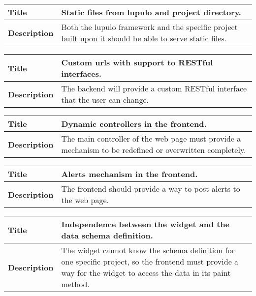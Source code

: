 \documentclass[12pt]{article}
\begin{document}
                \begin{tabularx}{\textwidth}{|l|X|}
                    \hline
                    \textbf{Title} & Static files from lupulo and project
                    directory. \\
                    \hline
                    \textbf{Description} & Both the lupulo framework and the
                    specific project built upon it should be able to serve
                    static files. \\
                    \hline
                \end{tabularx}

                \begin{tabularx}{\textwidth}{|l|X|}
                    \hline
                    \textbf{Title} & Custom urls with support to RESTful
                    interfaces. \\
                    \hline
                    \textbf{Description} & The backend will provide a custom
                    RESTful interface that the user can change. \\
                    \hline
                \end{tabularx}

                \begin{tabularx}{\textwidth}{|l|X|}
                    \hline
                    \textbf{Title} & Dynamic controllers in the frontend. \\
                    \hline
                    \textbf{Description} & The main controller of the web page
                    must provide a mechanism to be redefined or overwritten
                    completely. \\
                    \hline
                \end{tabularx}

                \begin{tabularx}{\textwidth}{|l|X|}
                    \hline
                    \textbf{Title} & Alerts mechanism in the frontend. \\
                    \hline
                    \textbf{Description} & The frontend should provide a way to
                    post alerts to the web page. \\
                    \hline
                \end{tabularx}

                \begin{tabularx}{\textwidth}{|l|X|}
                    \hline
                    \textbf{Title} & Independence between the widget and the
                    data schema definition. \\
                    \hline
                    \textbf{Description} & The widget cannot know the schema
                    definition for one specific project, so the frontend must
                    provide a way for the widget to access the data in its paint
                    method. \\
                    \hline
                \end{tabularx}
\end{document}
